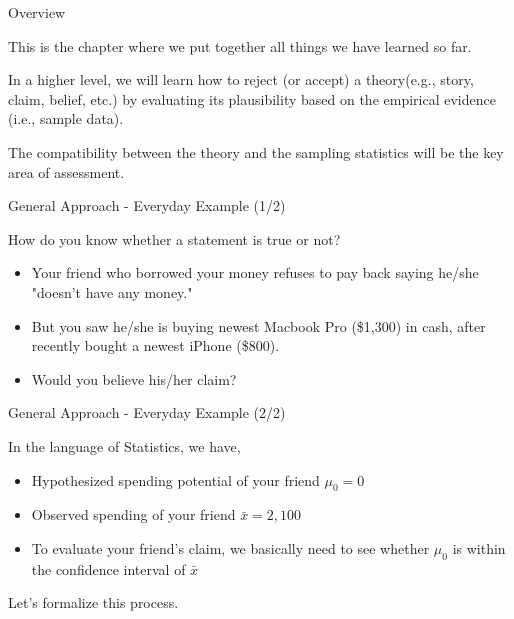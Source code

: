 \documentclass{beamer}
\begin{document}
\begin{frame}
\subsectionpage
\end{frame}


\begin{frame}{Overview}

This is the chapter where we put together all things we have learned so far. 

\vspace{0.3 cm}
In a higher level, we will learn how to reject (or accept) a theory(e.g., story, claim, belief, etc.) by evaluating its plausibility based on the empirical evidence (i.e., sample data). 

\vspace{0.3 cm}
The compatibility between the theory and the sampling statistics will be the key area of assessment. 

\end{frame}



\begin{frame}{General Approach - Everyday Example (1/2)}

How do you know whether a statement is true or not? 

\begin{itemize}
\item Your friend who borrowed your money refuses to pay back saying he/she "doesn't have any money."
\item But you saw he/she is buying newest Macbook Pro (\$1,300) in cash, after recently bought a newest iPhone (\$800). 
\item Would you believe his/her claim? 
\end{itemize}


\end{frame}


\begin{frame}{General Approach - Everyday Example (2/2)}

In the language of Statistics, we have,
\begin{itemize}
\item Hypothesized spending potential of your friend $\mu_0 = 0$
\item Observed spending of your friend $ \bar{x} = 2,100 $
\item To evaluate your friend's claim, we basically need to see whether $\mu_0$ is within the confidence interval of $\bar{x}$
\end{itemize}

Let's formalize this process.


\end{frame}
\end{document}
